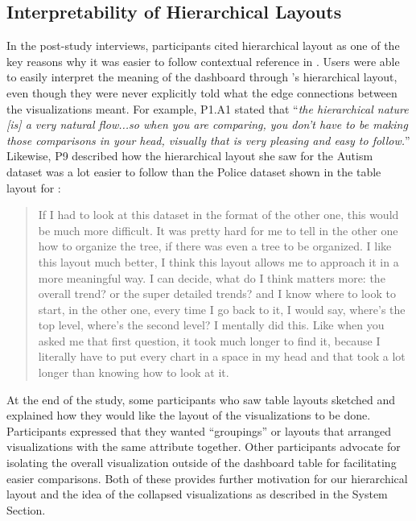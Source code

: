 \subsection{Interpretability of Hierarchical Layouts}
\par In the post-study interviews,  participants cited hierarchical layout as one of the key reasons why it was easier to follow contextual reference in \system. Users were able to easily interpret the meaning of the dashboard through \system's hierarchical layout, even though they were never explicitly told what the edge connections between the visualizations meant. For example, P1.A1 stated that ``\textit{the hierarchical nature [is] a very natural flow...so when you are comparing, you don't have to be making those comparisons in your head, visually that is very pleasing and easy to follow.}'' %
Likewise, P9 described how the hierarchical layout she saw for the Autism dataset was a lot easier to follow than the Police dataset shown in the table layout for \cluster:
\begin{quote}
If I had to look at this dataset in the format of the other one, this would be much more difficult. It was pretty hard for me to tell in the other one how to organize the tree, if there was even a tree to be organized. I like this layout much better, I think this layout allows me to approach it in a more meaningful way. I can decide, what do I think matters more: the overall trend? or the super detailed trends? and I know where to look to start, in the other one, every time I go back to it, I would say, where's the top level, where's the second level? I mentally did this. Like when you asked me that first question, it took much longer to find it, because I literally have to put every chart in a space in my head and that took a lot longer than knowing how to look at it.
\end{quote}
At the end of the study, some participants who saw table layouts sketched and explained how they would like the layout of the visualizations to be done. Participants expressed that they wanted ``groupings'' or layouts that arranged visualizations with the same attribute together. Other participants advocate for isolating the overall visualization outside of the dashboard table for facilitating easier comparisons. Both of these provides further motivation for our hierarchical layout and the idea of the collapsed visualizations as described in the System Section.%
